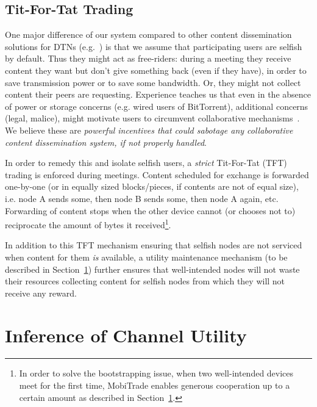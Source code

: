 \subsection{Tit-For-Tat Trading}
\label{contents-trading-scheduling}

One major difference of our system compared to other content dissemination solutions for DTNs (e.g.~\cite{May07wirelessopportunistic,ContentPlace,TACODTN}) is that we assume that participating users are selfish by default. Thus they might act as free-riders: during a meeting they receive content they want but don't give something back (even if they have), in order to save transmission power or to save some bandwidth. Or, they might not collect content their peers are requesting. Experience teaches us that even in the absence of power or storage concerns (e.g. wired users of BitTorrent), additional concerns (legal, malice), might motivate users to circumvent collaborative mechanisms~\cite{BitThief}. We believe these are \emph{powerful incentives that could sabotage any collaborative content dissemination system, if not properly handled}.

In order to remedy this and isolate selfish users, a \emph{strict} Tit-For-Tat (TFT) trading is enforced during meetings. Content scheduled for exchange is forwarded one-by-one (or in equally sized blocks/pieces, if contents are not of equal size), i.e. node A sends some, then node B sends some, then node A again, etc. Forwarding of content stops when the other device cannot (or chooses not to) reciprocate the amount of bytes it received\footnote{In order to solve the bootstrapping issue, when two well-intended devices meet for the first time, MobiTrade enables generous cooperation up to a certain amount as described in Section~\ref{managing-channels}.}. 

In addition to this TFT mechanism ensuring that selfish nodes are not serviced when content for them \emph{is} available, a utility maintenance mechanism (to be described in Section~\ref{managing-channels}) further ensures that well-intended nodes will not waste their resources collecting content for selfish nodes from which they will not receive any reward.


\section{Inference of Channel Utility}
\label{managing-channels}

